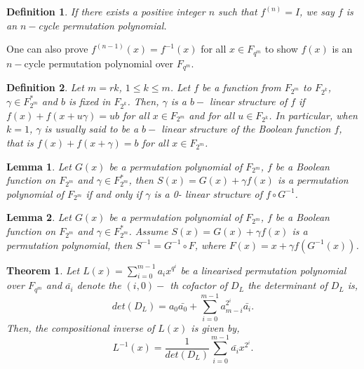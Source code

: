 \documentclass[12pt,a4paper]{article}
\newtheorem{definition}{Definition}[section]
\newtheorem{theorem}{Theorem}[section]
\newtheorem{lemma}{Lemma}[section]
\begin{document}
\begin{definition}\cite{niu2023more}\label{d1}
	If there exists a positive integer $ n $ such that $ f^{(n)}=I $, we say $ f $ is an $ n-$cycle permutation polynomial. 	
\end{definition}
One can also prove  $ f^{(n-1)}(x)=f^{-1}(x) $ for all $ x\in F_{q^{m}} $ to show $ f(x) $ is an $ n-$cycle permutation polynomial over $ F_{q^{m}} $.

\begin{definition}\label{d2}\cite{charpin2016involutions}
	Let $ m=rk $, $1\leq k\leq m$. Let $ f $ be a function from $ F_{2^{m}} $ to $ F_{2^{k}} $, $ \gamma\in F_{2^{m}}^{*} $ and $ b $ is fixed in $ F_{2^{k}} $. Then, $ \gamma $ is a $ b- $ linear structure of $ f $ if $ f(x)+f(x+u\gamma)=ub $ for all $ x\in F_{2^{m}} $ and for all $ u\in F_{2^{k}} $. In particular, when $ k=1 $, $\gamma$ is usually said to be a $ b- $ linear structure of the Boolean function $ f $, that is $ f(x)+f(x+\gamma)=b $ for all $ x\in F_{2^{m}} $. 
\end{definition}
\begin{lemma}\label{l2}\cite{charpin2008class}
	Let $ G(x) $ be a permutation polynomial of $ F_{2^{m}} $, $ f $ be a Boolean function on $ F_{2^{m}} $ and $ \gamma\in F_{2^{m}}^{*} $, then $ S(x)=G(x)+\gamma f(x) $ is a permutation polynomial of $ F_{2^{m}} $ if and only if $ \gamma $ is a 0- linear structure of $ f\circ G^{-1} $.
\end{lemma}
\begin{lemma}\label{l3}\cite{charpin2016involutions}
	Let $ G(x) $ be a permutation polynomial of $F_{2^{m}}$, $ f $ be a Boolean function on $ F_{2^{m}} $ and $ \gamma\in F_{2^{m}}^{*} $. Assume $ S(x)= G(x)+\gamma f(x)$ is a permutation polynomial, then $ S^{-1}=G^{-1}\circ F $, where $ F(x)=x+\gamma f(G^{-1}(x)) $.
\end{lemma}
\begin{theorem}\label{t1}\cite{wu2013linearized}
	Let $ L(x)=\sum\limits_{i=0}^{m-1}a_{i}x^{q^{i}} $ be a linearised permutation polynomial over $ F_{q^{m}} $ and $ \bar{a_{i}} $ denote the $(i,0)-$ th cofactor of $ D_{L} $ the determinant of $ D_{L} $ is, 
	\begin{equation}
		det(D_{L})=a_{0}\bar{a_{0}}+\sum\limits_{i=0}^{m-1}a^{2^{i}}_{m-i}\bar{a_{i}}.
	\end{equation}
	Then, the compositional inverse of $ L(x) $ is given by,
	\begin{equation}
		L^{-1}(x)=\frac{1}{det(D_{L})}\sum\limits_{i=0}^{m-1}\bar{a_{i}}x^{2^{i}}.
	\end{equation}
\end{theorem} 
\end{document}
